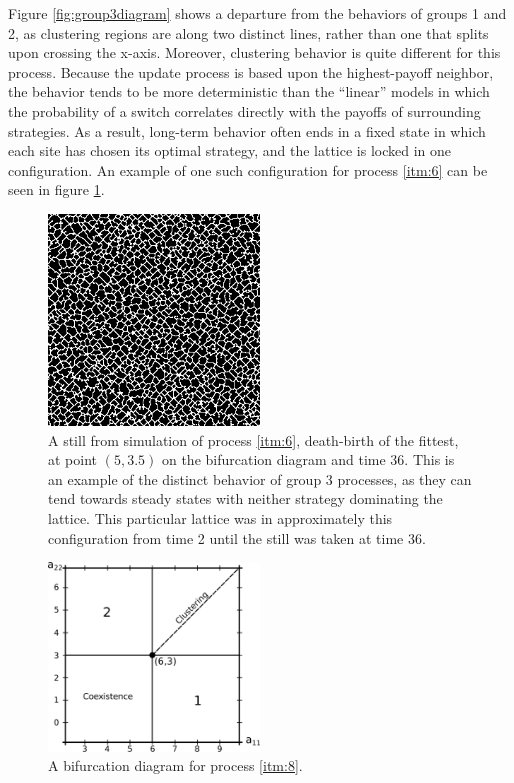 \documentclass[notitlepage,reqno]{amsart}
\begin{document}
Figure \ref{fig:group3diagram} shows a departure from the behaviors of
groups 1 and 2, as clustering regions are along two distinct lines,
rather than one that splits upon crossing the x-axis. Moreover,
clustering behavior is quite different for this process. Because the
update process is based upon the highest-payoff neighbor, the behavior
tends to be more deterministic than the ``linear'' models in which
the probability of a switch correlates directly with the payoffs of
surrounding strategies. As a result, long-term behavior often ends in a
fixed state in which each site has chosen its optimal
strategy, and the lattice is locked in one configuration. An example
of one such configuration for process \ref{itm:6} can be seen in
figure \ref{fig:process6coexistence}.

\begin{figure}[h]
\includegraphics[width=0.5\textwidth]{./images/Time36-Process5.png}
\caption{
A still from simulation of process \ref{itm:6}, death-birth of the
fittest, at point $(5,3.5)$ on the bifurcation diagram and time 36. This is an
example of the distinct behavior of group 3 processes, as
they can tend towards steady states with neither strategy dominating
the lattice. This particular lattice was in approximately this
configuration from time 2 until the still was taken at time 36.
}
\label{fig:process6coexistence}
\end{figure}

\begin{figure}[h]
\includegraphics[width=0.5\textwidth]{./images/process_8_bifurcation_diagram.eps}
\caption{
A bifurcation diagram for process \ref{itm:8}.
}
\label{fig:process8diagram}
\end{figure}
\end{document}
